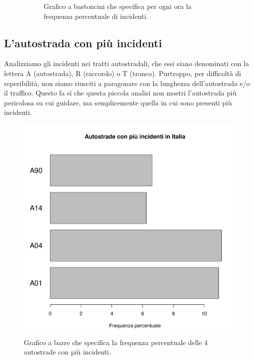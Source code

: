 \documentclass[12pt,a4paper,final,oneside]{article}			%
\begin{document}
\begin{figure}[h]
\begin{subfigure}{.48\textwidth}
                \caption{Grafico a bastoncini che specifica per ogni ora la frequenza percentuale di incidenti.}
                \label{Fig: incidenti_per_ora_barrette}
            \end{subfigure}
            \caption{}
        \end{figure}

\clearpage        
    \subsection{L'autostrada con più incidenti}
        Analizziamo gli incidenti nei tratti autostradali, che essi siano denominati con la lettera A (autostrada), R (raccordo) o T (tronco). Purtroppo, per difficoltà di reperibilità, non siamo riusciti a paragonare con la lunghezza dell'autostrada e/o il traffico. Questo fa sì che questa piccola analisi non mostri l'autostrada più pericolosa su cui guidare, ma semplicemente quella in cui sono presenti più incidenti.
        
        \begin{figure}[h!]
            \centering
            \includegraphics[scale=0.6]{./../results/maggiori_autostrade.pdf}
            \caption{Grafico a barre che specifica la frequenza percentuale delle 4 autostrade con più incidenti.}
            \label{Fig: incidenti_autostrade}
        \end{figure}
        
\end{document}
